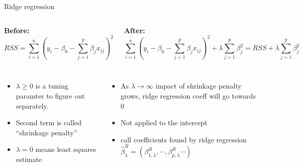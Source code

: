 \documentclass[aspectratio=169,usenames,dvipsnames]{beamer}
\newcommand{\InstructorList}[1]{
\begin{itemize}
	\color{orange}
	#1
\end{itemize}
}
\begin{document}
\begin{frame}[t]{Ridge regression}

\begin{columns}
\centering
\textbf{Before:}
\footnotesize
\begin{equation*}
	RSS = \sum_{i=1}^n \left(y_i - \beta_0 - \sum_{j=1}^p \beta_j x_{ij}\right)^2
\end{equation*}

\centering
\textbf{After:}
\begin{equation*}
	\sum_{i=1}^n \left(y_i - \beta_0 - \sum_{j=1}^p \beta_j x_{ij}\right)^2 + \lambda \sum_{j=1}^p \beta_j^2 = RSS + \lambda \sum_{j=1}^p \beta_j^2
\end{equation*}

\end{columns}


\begin{columns}
\centering
\footnotesize
\InstructorList{
\item $\lambda \geq 0$ is a tuning paramter to figure out separately.
\item Second term is called ``shrinkage penalty''
\item $\lambda = 0$ means least squares estimate
}
\centering

\footnotesize
\InstructorList{
\item As $\lambda \to \infty$ impact of shrinkage penalty grows, ridge regression coeff will go towards 0
\item Not applied to the intercept
\item call coefficients found by ridge regression $\hat \beta_\lambda^R = (\beta_{1,\lambda}^R, \cdots,\beta_{p,\lambda}^R \cdots )$
}
\end{columns}

\end{frame}
\end{document}
